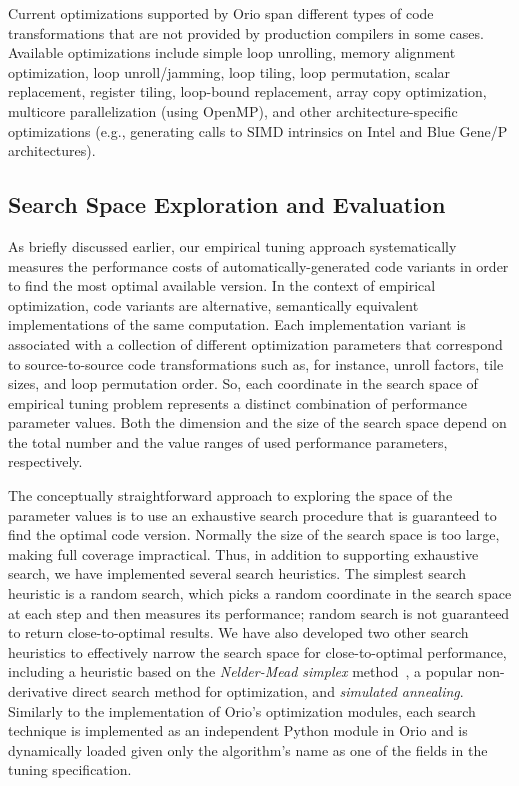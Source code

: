 Current optimizations supported by Orio span different types of code
transformations that are not provided by production compilers in some
cases. Available optimizations include simple loop unrolling, memory
alignment optimization, loop unroll/jamming, loop tiling, loop permutation,
scalar replacement, register tiling, loop-bound replacement, array copy
optimization, multicore parallelization (using OpenMP), and other
architecture-specific optimizations (e.g., generating calls to SIMD
intrinsics on Intel and Blue Gene/P architectures).

\subsection{Search Space Exploration and Evaluation}
\label{sec:search-space}

As briefly discussed earlier, our empirical tuning approach systematically
measures the performance costs of automatically-generated code variants in
order to find the most optimal available version. In the context of empirical
optimization, code variants are alternative, semantically equivalent
implementations of the same computation. Each implementation variant is
associated with a collection of different optimization parameters that
correspond to source-to-source code transformations such as, for instance,
unroll factors, tile sizes, and loop permutation order. So, each coordinate
in the search space of empirical tuning problem represents a distinct
combination of performance parameter values. Both the dimension and the size
of the search space depend on the total number and the value ranges of used
performance parameters, respectively.

The conceptually straightforward approach to exploring the space of the
parameter values is to use an exhaustive search procedure that is guaranteed
to find the optimal code version. Normally the size of the search space
is too large, making full coverage impractical.  Thus, in addition to
supporting exhaustive search, we have implemented several search heuristics.
The simplest search heuristic is a random search, which picks a random
coordinate in the search space at each step and then measures its
performance; random search is not guaranteed to return close-to-optimal results.
We have also developed two other search heuristics to effectively
narrow the search space for close-to-optimal performance, including a
heuristic based on the \textit{Nelder-Mead simplex}
method~\cite{Lagarias98simplex,Lewis00directsearch}, 
a popular non-derivative direct search method for optimization, and \textit{simulated
annealing}\cite{Kirkpatrick83optimizationby}.
Similarly to the implementation of Orio's optimization modules, each search
technique is implemented as an independent Python module in Orio and is dynamically
loaded given only the algorithm's name as one of the fields in the tuning
specification.

